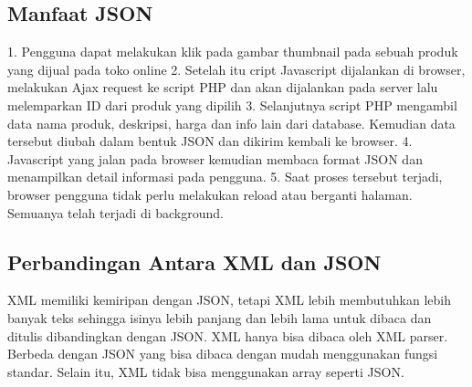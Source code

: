 \documentclass[a4paper]{article}
\begin{document}
\subsection{Manfaat JSON}
1.	Pengguna dapat melakukan klik pada gambar thumbnail pada sebuah produk yang dijual pada toko online
2.	Setelah itu cript Javascript dijalankan di browser, melakukan Ajax request ke script PHP dan akan dijalankan pada server lalu melemparkan ID dari produk yang dipilih
3.	Selanjutnya script PHP mengambil data nama produk, deskripsi, harga dan info lain dari database. Kemudian data tersebut diubah dalam bentuk JSON dan dikirim kembali ke browser.
4.	Javascript yang jalan pada browser kemudian membaca format JSON dan menampilkan detail informasi pada pengguna.
5.	Saat proses tersebut terjadi, browser pengguna tidak perlu melakukan reload atau berganti halaman. Semuanya telah terjadi di background.

\subsection{Perbandingan Antara XML dan JSON}
XML memiliki kemiripan dengan JSON, tetapi XML lebih membutuhkan lebih banyak teks sehingga isinya lebih panjang dan lebih lama untuk dibaca dan ditulis dibandingkan dengan JSON. XML hanya bisa dibaca oleh XML parser. Berbeda dengan JSON yang bisa dibaca dengan mudah menggunakan fungsi standar. Selain itu, XML tidak bisa menggunakan array seperti JSON.
\end{document}
